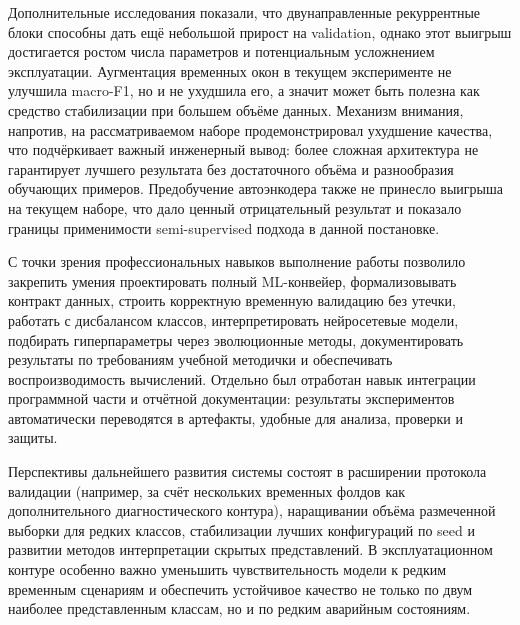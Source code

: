 \documentclass[14pt,a4paper]{extarticle}
\begin{document}
Дополнительные исследования показали, что двунаправленные рекуррентные блоки способны дать ещё небольшой прирост на validation, однако этот выигрыш достигается ростом числа параметров и потенциальным усложнением эксплуатации. Аугментация временных окон в текущем эксперименте не улучшила macro-F1, но и не ухудшила его, а значит может быть полезна как средство стабилизации при большем объёме данных. Механизм внимания, напротив, на рассматриваемом наборе продемонстрировал ухудшение качества, что подчёркивает важный инженерный вывод: более сложная архитектура не гарантирует лучшего результата без достаточного объёма и разнообразия обучающих примеров. Предобучение автоэнкодера также не принесло выигрыша на текущем наборе, что дало ценный отрицательный результат и показало границы применимости semi-supervised подхода в данной постановке.

С точки зрения профессиональных навыков выполнение работы позволило закрепить умения проектировать полный ML-конвейер, формализовывать контракт данных, строить корректную временную валидацию без утечки, работать с дисбалансом классов, интерпретировать нейросетевые модели, подбирать гиперпараметры через эволюционные методы, документировать результаты по требованиям учебной методички и обеспечивать воспроизводимость вычислений. Отдельно был отработан навык интеграции программной части и отчётной документации: результаты экспериментов автоматически переводятся в артефакты, удобные для анализа, проверки и защиты.

Перспективы дальнейшего развития системы состоят в расширении протокола валидации (например, за счёт нескольких временных фолдов как дополнительного диагностического контура), наращивании объёма размеченной выборки для редких классов, стабилизации лучших конфигураций по seed и развитии методов интерпретации скрытых представлений. В эксплуатационном контуре особенно важно уменьшить чувствительность модели к редким временным сценариям и обеспечить устойчивое качество не только по двум наиболее представленным классам, но и по редким аварийным состояниям.
\end{document}
